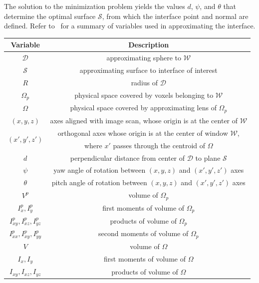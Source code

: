 The solution to the minimization problem yields the values $d$, $\psi$, and $\theta$ that determine the optimal surface $\mathcal{S}$, from which the interface point and normal are defined. Refer to~ for a summary of variables used in approximating the interface.

\begin{table}[htbp!]
 \centering
   \begin{tabular}{|c||c|}
   \hline
   {\textbf{Variable}} & {\textbf{Description}} \\ \hline \hline
   $\mathcal{D}$ & approximating sphere to $\mathcal{W}$ \\ \hline
   $\mathcal{S}$ & approximating surface to interface of interest \\ \hline      
   $R$ & radius of $\mathcal{D}$ \\ \hline   
   $\Omega_p$ & physical space covered by voxels belonging to $\mathcal{W}$ \\ \hline
   $\Omega$ & physical space covered by approximating lens of $\Omega_p$ \\ \hline      
   $(x,y,z)$ & axes aligned with image scan, whose origin is at the center of $\mathcal{W}$\\ \hline
   \multirow{2}{*}{$(x',y',z')$} & orthogonal axes whose origin is at the center of window $\mathcal{W}$,\\
   {} & where $x'$ passes through the centroid of $\Omega$ \\ \hline   
   $d$ & perpendicular distance from center of $\mathcal{D}$ to plane $\mathcal{S}$  \\ \hline
   $\psi$ & yaw angle of rotation between $(x,y,z)$ and $(x',y',z')$ axes \\ \hline   
   $\theta$ & pitch angle of rotation between $(x,y,z)$ and $(x',y',z')$ axes \\ \hline
   $V^p$ & volume of $\Omega_p$ \\ \hline
   $I_{x}^p, I_y^p$ & first moments of volume of $\Omega_p$ \\ \hline     
   $I_{xy}^p, I_{xz}^p, I_{yz}^p$ & products of volume of $\Omega_p$ \\ \hline      
   $I_{xx}^p, I_{xy}^p, I_{yy}^p$ & second moments of volume of $\Omega_p$ \\ \hline
   $V$ & volume of $\Omega$ \\ \hline
   $I_{x}, I_y$ & first moments of volume of $\Omega$ \\ \hline
   $I_{xy}, I_{xz}, I_{yz}$ & products of volume of $\Omega$ \\ \hline   

\end{tabular}
\end{table}
